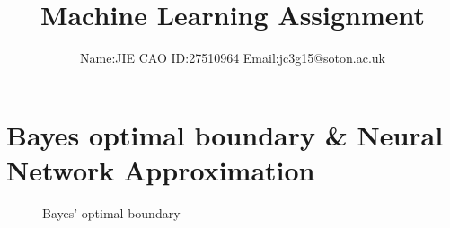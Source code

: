 \documentclass{article}
\author{Name:JIE CAO \quad ID:27510964 \quad Email:jc3g15@soton.ac.uk}
\title{Machine Learning Assignment}
\begin{document}
 
\maketitle 
\section{Bayes optimal boundary \& Neural Network Approximation}
\begin{figure}[htbp]
 \centering
 \caption{Bayes' optimal boundary}
\end{figure}
\end{document}
